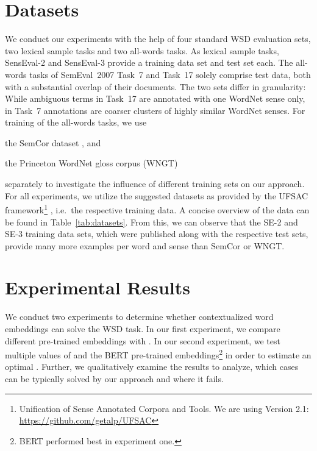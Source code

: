 \documentclass[11pt]{article}
\begin{document}
\section{Datasets}We conduct our experiments with the help of four standard WSD evaluation sets, two lexical sample tasks and two all-words tasks. 
As lexical sample tasks, SensEval-2 \cite[SE-2]{kilgarriff-2001-english} and SensEval-3 \cite[SE-3]{mihalcea-etal-2004-senseval} provide a training data set and test set each.
The all-words tasks of SemEval~2007 Task~7 \cite[S7-T7]{navigli.2007} and Task~17 \cite[S7-T17]{pradhan.2007} solely comprise test data, both with a substantial overlap of their documents. 
The two sets differ in granularity: While ambiguous terms in Task~17 are annotated with one WordNet sense only, in Task~7 annotations are coarser clusters of highly similar WordNet senses.
For training of the all-words tasks, we use \begin{inparaenum}
\item the SemCor dataset \cite{miller.1993}, and
\item the Princeton WordNet gloss corpus (WNGT) \cite{fellbaum.1998}
\end{inparaenum}
separately to investigate the influence of different training sets on our approach.
For all experiments, we utilize the suggested datasets as provided by the UFSAC framework\footnote{Unification of Sense Annotated Corpora and Tools. We are using Version 2.1: \small\url{https://github.com/getalp/UFSAC}} \cite{viali.2018}, i.e.\ the respective training data.
A concise overview of the data can be found in Table~\ref{tab:datasets}.
From this, we can observe that the SE-2 and SE-3 training data sets, which were published along with the respective test sets, provide many more examples per word and sense than SemCor or WNGT.

\section{Experimental Results}\label{sec:results}We conduct two experiments to determine whether contextualized word embeddings can solve the WSD task. 
In our first experiment, we compare different pre-trained embeddings with .
In our second experiment, we test multiple values of  and the BERT pre-trained embeddings\footnote{BERT performed best in experiment one.} in order to estimate an optimal .
Further, we qualitatively examine the results to analyze, which cases can be typically solved by our approach and where it fails.
\end{document}
